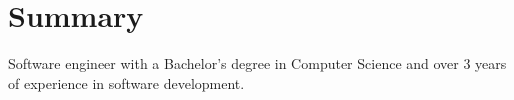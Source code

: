 \documentclass[letterpaper,11pt]{article}
\makeatletter
\newcommand{\resumeItem}[1]{\item\small{#1}\vspace{1pt}}
\newcommand{\resumeSubSubheading}[2]{
    \item
    \begin{tabular*}{0.97\textwidth}{l@{\extracolsep{\fill}}r}
      \textit{\small#1} & \textit{\small #2} \\
    \end{tabular*}\vspace{-7pt}
}
\newcommand{\resumeSubHeadingListEnd}{\end{itemize}}
\newcommand{\resumeItemListStart}{\begin{itemize}[itemsep=2pt,topsep=3pt,parsep=0pt,partopsep=0pt]}
\newcommand{\resumeItemListEnd}{\end{itemize}\vspace{-5pt}}
\makeatother
\begin{document}


\section{Summary}
\vspace{-4pt}
\small{Software engineer with a Bachelor's degree in Computer Science and over 3 years of experience in software development.}




      


% 



\end{document}
